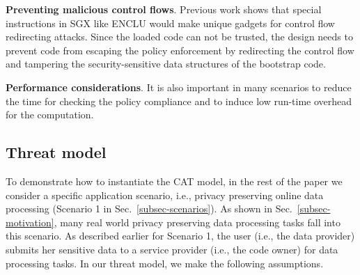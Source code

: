 {\vspace{3pt}\noindent\textbf{Preventing malicious control flows}.\label{challenge-cfi} 
    Previous work shows that special instructions in SGX like ENCLU would make unique gadgets for control flow redirecting attacks.
    Since the loaded code can not be trusted, the design needs to prevent code from escaping the policy enforcement by redirecting the control flow and tampering the security-sensitive data structures of the bootstrap code.

\vspace{3pt}\noindent\textbf{Performance considerations}.\label{challenge-perf} It is also important in many scenarios to reduce the time for checking the policy compliance and to induce low run-time overhead for the computation. 

\subsection{Threat model}
\label{subsec-threat}
To demonstrate how to instantiate the CAT model, in the rest of the paper we consider a specific application scenario, i.e., privacy preserving online data processing (Scenario 1 in Sec.~\ref{subsec-scenarios}). As shown in Sec.~\ref{subsec-motivation}, many real world privacy preserving data processing tasks fall into this scenario. 
As described earlier for Scenario 1, the user (i.e., the data provider) submits her sensitive data to a service provider (i.e., the code owner) for data processing tasks. In our threat model, we make the following assumptions.

}
